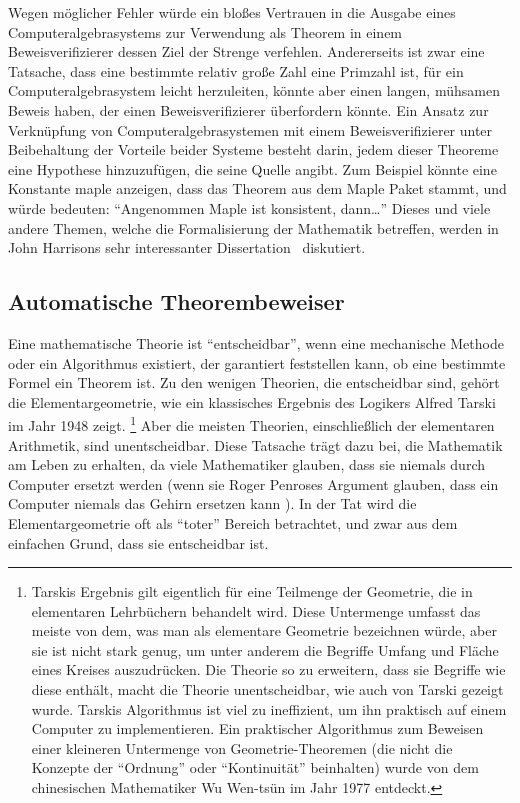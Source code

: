 Wegen möglicher Fehler würde ein bloßes Vertrauen in die Ausgabe eines Computeralgebrasystems zur Verwendung als Theorem in einem Beweisverifizierer dessen Ziel der Strenge verfehlen.
Andererseits ist zwar eine Tatsache, dass eine bestimmte relativ große Zahl eine Primzahl ist, für ein Computeralgebrasystem leicht herzuleiten, könnte aber einen langen, mühsamen Beweis haben, der einen Beweisverifizierer überfordern könnte. Ein Ansatz zur Verknüpfung von
Computeralgebrasystemen mit einem Beweisverifizierer unter Beibehaltung der Vorteile beider Systeme besteht darin, jedem dieser Theoreme eine Hypothese hinzuzufügen, die seine Quelle angibt.
Zum Beispiel könnte eine Konstante {\sc maple} anzeigen, dass das Theorem aus dem Maple
Paket stammt, und würde bedeuten: "`Angenommen Maple ist konsistent, dann\ldots"' Dieses und
viele andere Themen, welche die Formalisierung der Mathematik betreffen, werden in John Harrisons sehr interessanter Dissertation~\cite{Harrison-thesis} diskutiert.

\subsection{Automatische Theorembeweiser}\label{theoremprovers}

Eine mathematische Theorie ist "`entscheidbar"', wenn eine mechanische Methode oder ein Algorithmus existiert, der garantiert feststellen kann, ob eine bestimmte Formel ein Theorem ist.  Zu den wenigen Theorien, die entscheidbar sind, gehört die Elementargeometrie, wie ein klassisches Ergebnis des Logikers Alfred Tarski im Jahr 1948
\cite{Tarski} zeigt.
\footnote{Tarskis Ergebnis gilt eigentlich für eine Teilmenge der Geometrie, die in elementaren Lehrbüchern behandelt wird.  Diese Untermenge umfasst das meiste von dem, was man als elementare Geometrie bezeichnen würde, aber sie ist nicht stark genug, um unter anderem die Begriffe Umfang und Fläche eines Kreises auszudrücken.  Die Theorie so zu erweitern, dass sie Begriffe wie diese enthält, macht die Theorie unentscheidbar, wie auch von Tarski gezeigt wurde.  Tarskis Algorithmus ist viel zu ineffizient, um ihn praktisch auf einem Computer zu implementieren.  Ein praktischer Algorithmus zum Beweisen einer kleineren Untermenge von Geometrie-Theoremen (die nicht die Konzepte der "`Ordnung"' oder "`Kontinuität"' beinhalten) wurde von dem chinesischen Mathematiker Wu Wen-ts\"{u}n im Jahr 1977 \cite{Chou} entdeckt.}
Aber die meisten Theorien, einschließlich der elementaren Arithmetik, sind unentscheidbar.  Diese Tatsache trägt dazu bei, die Mathematik am Leben zu erhalten, da viele Mathematiker glauben, dass sie niemals
durch Computer ersetzt werden (wenn sie Roger Penroses Argument glauben, dass ein Computer niemals das Gehirn ersetzen kann \cite{Penrose}).
In der Tat wird die Elementargeometrie oft als "`toter"' Bereich betrachtet, und zwar aus dem einfachen Grund, dass sie entscheidbar ist.


